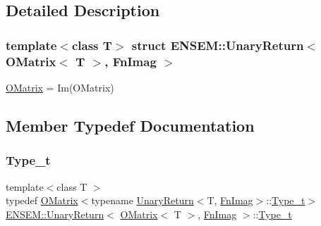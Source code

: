 \subsection{Detailed Description}
\subsubsection*{template$<$class T$>$\newline
struct E\+N\+S\+E\+M\+::\+Unary\+Return$<$ O\+Matrix$<$ T $>$, Fn\+Imag $>$}

\mbox{\hyperlink{classENSEM_1_1OMatrix}{O\+Matrix}} = Im(\+O\+Matrix) 

\subsection{Member Typedef Documentation}
\mbox{\label{structENSEM_1_1UnaryReturn_3_01OMatrix_3_01T_01_4_00_01FnImag_01_4_a0841f7311ee5495c55d754fd855f045c}} 
\subsubsection{\texorpdfstring{Type\_t}{Type\_t}\hspace{0.1cm}{\footnotesize\ttfamily [1/3]}}
{\footnotesize\ttfamily template$<$class T $>$ \\
typedef \mbox{\hyperlink{classENSEM_1_1OMatrix}{O\+Matrix}}$<$typename \mbox{\hyperlink{structENSEM_1_1UnaryReturn}{Unary\+Return}}$<$T, \mbox{\hyperlink{structENSEM_1_1FnImag}{Fn\+Imag}}$>$\+::\mbox{\hyperlink{structENSEM_1_1UnaryReturn_3_01OMatrix_3_01T_01_4_00_01FnImag_01_4_a0841f7311ee5495c55d754fd855f045c}{Type\+\_\+t}}$>$ \mbox{\hyperlink{structENSEM_1_1UnaryReturn}{E\+N\+S\+E\+M\+::\+Unary\+Return}}$<$ \mbox{\hyperlink{classENSEM_1_1OMatrix}{O\+Matrix}}$<$ T $>$, \mbox{\hyperlink{structENSEM_1_1FnImag}{Fn\+Imag}} $>$\+::\mbox{\hyperlink{structENSEM_1_1UnaryReturn_3_01OMatrix_3_01T_01_4_00_01FnImag_01_4_a0841f7311ee5495c55d754fd855f045c}{Type\+\_\+t}}}

\mbox{\label{structENSEM_1_1UnaryReturn_3_01OMatrix_3_01T_01_4_00_01FnImag_01_4_a0841f7311ee5495c55d754fd855f045c}} 
